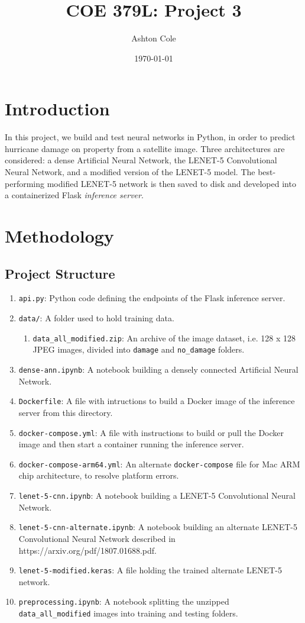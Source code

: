 \documentclass{article}
\title{COE 379L: Project 3}
\author{Ashton Cole}
\date{\today}
\begin{document}
\maketitle

\section{Introduction}

In this project, we build and test neural networks in Python, in order to predict hurricane damage on property from a satellite image. Three architectures are considered: a dense Artificial Neural Network, the LENET-5 Convolutional Neural Network, and a modified version of the LENET-5 model. The best-performing modified LENET-5 network is then saved to disk and developed into a containerized Flask \emph{inference server}.

\section{Methodology}

\subsection{Project Structure}

\begin{enumerate}
	\item \verb|api.py|: Python code defining the endpoints of the Flask inference server.
	\item \verb|data/|: A folder used to hold training data.
	\begin{enumerate}
		\item \verb|data_all_modified.zip|: An archive of the image dataset, i.e. 128 x 128 JPEG images, divided into \verb|damage| and \verb|no_damage| folders.
	\end{enumerate}
	\item \verb|dense-ann.ipynb|: A notebook building a densely connected Artificial Neural Network.
	\item \verb|Dockerfile|: A file with intructions to build a Docker image of the inference server from this directory.
	\item \verb|docker-compose.yml|: A file with instructions to build or pull the Docker image and then start a container running the inference server.
	\item \verb|docker-compose-arm64.yml|: An alternate \verb|docker-compose| file for Mac ARM chip architecture, to resolve platform errors.
	\item \verb|lenet-5-cnn.ipynb|: A notebook building a LENET-5 Convolutional Neural Network.
	\item \verb|lenet-5-cnn-alternate.ipynb|: A notebook building an alternate LENET-5 Convolutional Neural Network described in https://arxiv.org/pdf/1807.01688.pdf.
	\item \verb|lenet-5-modified.keras|: A file holding the trained alternate LENET-5 network.
	\item \verb|preprocessing.ipynb|: A notebook splitting the unzipped \verb|data_all_modified| images into training and testing folders.
\end{enumerate}
\end{document}
